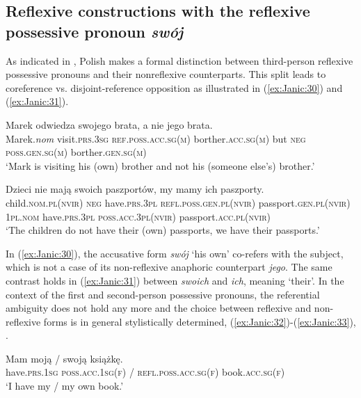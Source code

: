 \documentclass[output=paper]{langscibook}
\begin{document}
\subsection{Reflexive constructions with the reflexive possessive pronoun \textit{swój}} \label{sec:Janic:3.3}

As indicated in , Polish makes a formal distinction between third-person reflexive possessive pronouns and their nonreflexive counterparts. This split leads to coreference vs. disjoint-reference opposition as illustrated in (\ref{ex:Janic:30}) and (\ref{ex:Janic:31}). 

\ea \label{ex:Janic:30}
\gll Marek		 odwiedza	 swojego		 brata, a	nie	 jego			 brata.\\
	 Marek.\textit{nom}	visit.\textsc{prs.3sg}	\textsc{ref.poss.acc.sg(m)}	borther.\textsc{acc.sg(m)} but \textsc{neg}	\textsc{poss.gen.sg(m)}	borther.\textsc{gen.sg(m)}\\
\glt ‘Mark is visiting his (own) brother and not his (someone else’s) brother.’
\z 

\ea \label{ex:Janic:31}
\gll Dzieci		 nie	 mają		 swoich			 paszportów, my	 mamy	 ich		 paszporty.\\
	 child.\textsc{nom.pl(nvir)}	\textsc{neg}	have.\textsc{prs.3pl}	\textsc{refl.poss.gen.pl(nvir)}	passport.\textsc{gen.pl(nvir)}	\textsc{1pl.nom}	have.\textsc{prs.3pl}	\textsc{poss.acc.3pl(nvir)}	 passport.\textsc{acc.pl(nvir)}\\
\glt ‘The children do not have their (own) passports, we have their passports.’ \citep[162]{Bielec1998} 
\z 		
		

In (\ref{ex:Janic:30}), the accusative form \textit{swój} ‘his own’ co-refers with the subject, which is not a case of its non-reflexive anaphoric counterpart \textit{jego}. The same contrast holds in (\ref{ex:Janic:31}) between \textit{swoich} and \textit{ich}, meaning ‘their’. In the context of the first and second-person possessive pronouns, the referential ambiguity does not hold any more and the choice between reflexive and non-reflexive forms is in general stylistically determined, (\ref{ex:Janic:32})-(\ref{ex:Janic:33}), \citep[73]{Feldstein2001}. 

\ea \label{ex:Janic:32}
\gll Mam		 moją		 /	 swoją	 książkę.\\
 	have.\textsc{prs.1sg}	\textsc{poss.acc.1sg(f)}	/	 \textsc{refl.poss.acc.sg(f)}	book.\textsc{acc.sg(f)}	\\	
\glt ‘I have my / my own book.’
\z 
\end{document}
